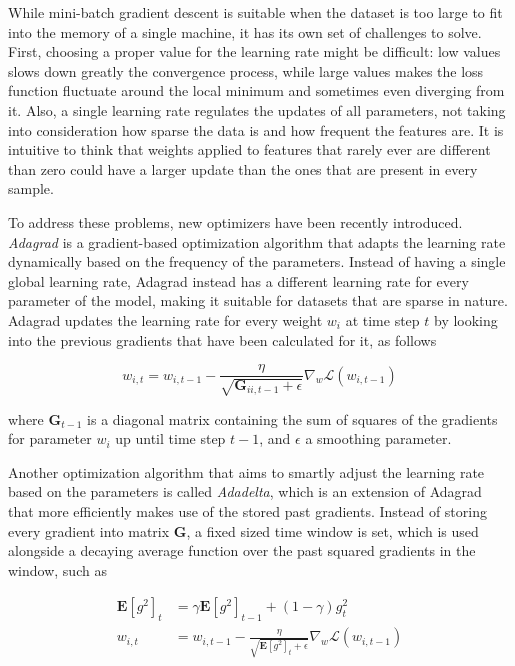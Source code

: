 \documentclass{kththesis}
\begin{document}
While mini-batch gradient descent is suitable when the dataset is too large to fit into the memory of a single machine, it has its own set of challenges to solve. First, choosing a proper value for the learning rate might be difficult: low values slows down greatly the convergence process, while large values makes the loss function fluctuate around the local minimum and sometimes even diverging from it. Also, a single learning rate regulates the updates of all parameters, not taking into consideration how sparse the data is and how frequent the features are. It is intuitive to think that weights applied to features that rarely ever are different than zero could have a larger update than the ones that are present in every sample.

To address these problems, new optimizers have been recently introduced. \emph{Adagrad} \citep{duchi2011adaptive} is a gradient-based optimization algorithm that adapts the learning rate dynamically based on the frequency of the parameters. Instead of having a single global learning rate, Adagrad instead has a different learning rate for every parameter of the model, making it suitable for datasets that are sparse in nature. Adagrad updates the learning rate for every weight $w_i$ at time step $t$ by looking into the previous gradients that have been calculated for it, as follows

\begin{equation}
w_{i,t} = w_{i,t-1} - \frac{\eta}{\sqrt{\mathbf{G}_{ii, t-1} + \epsilon}} \nabla_w \mathcal{L}(w_{i,t-1})
\end{equation}

where $\mathbf{G}_{t-1}$ is a diagonal matrix containing the sum of squares of the gradients for parameter $w_i$ up until time step $t-1$, and $\epsilon$ a smoothing parameter.

Another optimization algorithm that aims to smartly adjust the learning rate based on the parameters is called \emph{Adadelta}\citep{zeiler2012adadelta}, which is an extension of Adagrad that more efficiently makes use of the stored past gradients. Instead of storing every gradient into matrix $\mathbf{G}$, a fixed sized time window is set, which is used alongside a decaying average function over the past squared gradients in the window, such as

\begin{equation}
\begin{aligned}
\mathbf{E}[g^2]_t &= \gamma \mathbf{E}[g^2]_{t-1} + (1-\gamma)g^2_t\\
w_{i,t} &= w_{i,t-1} - \frac{\eta}{\sqrt{\mathbf{E}[g^2]_t + \epsilon}} \nabla_w \mathcal{L}(w_{i,t-1}) \\
\end{aligned}
\end{equation}
\end{document}
